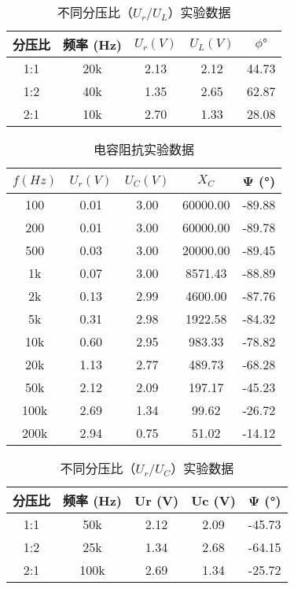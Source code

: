 \documentclass[dvipsnames, svgnames,a4paper,11pt]{article}
\begin{document}
\begin{enumerate}
				\begin{table}[h]
					\centering
					\begin{tabular}{|c|c|c|c|c|}
						\hline
						分压比 & 频率 (Hz) & $U_r (V)$ & $U_L (V)$ & $\phi °$ \\
						\hline
						1:1 & 20k & 2.13 & 2.12 & 44.73 \\
						1:2 & 40k & 1.35 & 2.65 & 62.87 \\
						2:1 & 10k & 2.70 & 1.33 & 28.08 \\
						\hline
					\end{tabular}
					\caption{不同分压比（$U_r $/$U_L $）实验数据}
				\end{table}
				\begin{table}[H]
					\centering
					\begin{tabular}{|c|c|c|c|c|}
						\hline
						$f (Hz)$ & $U_r (V)$ & $U_C (V)$ & $X_C$ & Ψ (°) \\
						\hline
						100      & 0.01  & 3.00  & 60000.00 & -89.88 \\
						200      & 0.01  & 3.00  & 60000.00 & -89.78 \\
						500      & 0.03  & 3.00  & 20000.00 & -89.45 \\
						1k       & 0.07  & 3.00  & 8571.43  & -88.89 \\
						2k       & 0.13  & 2.99  & 4600.00  & -87.76 \\
						5k       & 0.31  & 2.98  & 1922.58 & -84.32 \\
						10k      & 0.60  & 2.95  & 983.33  & -78.82 \\
						20k      & 1.13  & 2.77  & 489.73 & -68.28 \\
						50k      & 2.12  & 2.09  & 197.17 & -45.23 \\
						100k     & 2.69  & 1.34  & 99.62 & -26.72 \\
						200k     & 2.94  & 0.75  & 51.02  & -14.12 \\
						\hline
					\end{tabular}
					\caption{电容阻抗实验数据}
				\end{table}
				\begin{table}[H]
					\centering
					\begin{tabular}{|c|c|c|c|c|}
						\hline
						分压比 & 频率 (Hz) & Ur (V) & Uc (V) & Ψ (°) \\
						\hline
						1:1   & 50k       & 2.12  & 2.09  & -45.73 \\
						1:2   & 25k       & 1.34  & 2.68  & -64.15 \\
						2:1   & 100k      & 2.69  & 1.34  & -25.72 \\
						\hline
					\end{tabular}
					\caption{不同分压比（$U_r $/$U_C $）实验数据}
				\end{table}
	\end{enumerate}	
	
\end{document}
